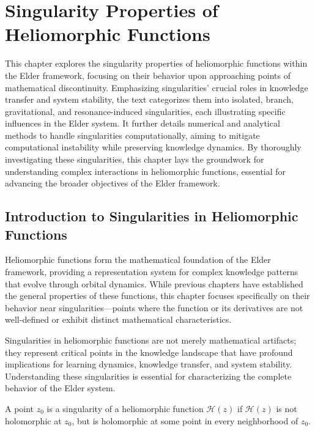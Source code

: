 \chapter{Singularity Properties of Heliomorphic Functions}

\begin{tcolorbox}[colback=blue!5!white,colframe=blue!75!black,title=Chapter Summary]
This chapter explores the singularity properties of heliomorphic functions within the Elder framework, focusing on their behavior upon approaching points of mathematical discontinuity. Emphasizing singularities' crucial roles in knowledge transfer and system stability, the text categorizes them into isolated, branch, gravitational, and resonance-induced singularities, each illustrating specific influences in the Elder system. It further details numerical and analytical methods to handle singularities computationally, aiming to mitigate computational instability while preserving knowledge dynamics. By thoroughly investigating these singularities, this chapter lays the groundwork for understanding complex interactions in heliomorphic functions, essential for advancing the broader objectives of the Elder framework.
\end{tcolorbox}

\section{Introduction to Singularities in Heliomorphic Functions}

Heliomorphic functions form the mathematical foundation of the Elder framework, providing a representation system for complex knowledge patterns that evolve through orbital dynamics. While previous chapters have established the general properties of these functions, this chapter focuses specifically on their behavior near singularities—points where the function or its derivatives are not well-defined or exhibit distinct mathematical characteristics.

Singularities in heliomorphic functions are not merely mathematical artifacts; they represent critical points in the knowledge landscape that have profound implications for learning dynamics, knowledge transfer, and system stability. Understanding these singularities is essential for characterizing the complete behavior of the Elder system.

\begin{definition}
A point $z_0$ is a singularity of a heliomorphic function $\mathcal{H}(z)$ if $\mathcal{H}(z)$ is not holomorphic at $z_0$, but is holomorphic at some point in every neighborhood of $z_0$.
\end{definition}

